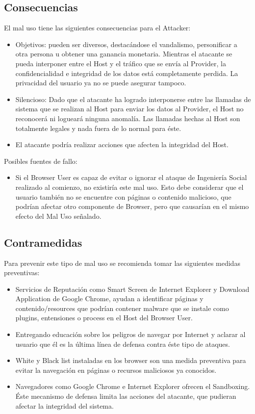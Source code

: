 \subsection{Consecuencias}
	El mal uso tiene las siguientes consecuencias para el Attacker:
	\begin{itemize}
		\item Objetivos: pueden ser diversos, destacándose el vandalismo, personificar a otra persona u obtener una ganancia monetaria. Mientras el atacante se pueda interponer entre el Host y el tráfico que se envía al Provider, la confidencialidad e integridad de los datos está completamente perdida. La privacidad del usuario ya no se puede asegurar tampoco.
		\item Silencioso: Dado que el atacante ha logrado interponerse entre las llamadas de sistema que se realizan al Host para enviar los datos al Provider, el Host no reconocerá ni logueará ninguna anomalía. Las llamadas hechas al Host son totalmente legales y nada fuera de lo normal para éste.
		\item El atacante podría realizar acciones que afecten la integridad del Host.
	\end{itemize}
	Posibles fuentes de fallo:
	\begin{itemize}
		\item Si el Browser User es capaz de evitar o ignorar el ataque de Ingeniería Social realizado al comienzo, no existiría este mal uso. Esto debe considerar que el usuario también no se encuentre con páginas o contenido malicioso, que podrían afectar otro componente de Browser, pero que causarían en el mismo efecto del Mal Uso señalado.
	\end{itemize}

\subsection{Contramedidas} 
	Para prevenir este tipo de mal uso se recomienda tomar las siguientes medidas preventivas:
	\begin{itemize}
		\item Servicios de Reputación como Smart Screen de Internet Explorer y Download Application de Google Chrome, ayudan a identificar páginas y contenido/resources que podrían contener malware que se instale como plugins, entensiones o process en el Host del Browser User.
		\item Entregando educación sobre los peligros de navegar por Internet y aclarar al usuario que él es la última línea de defensa contra éste tipo de ataques.
		\item White y Black list instaladas en los browser son una medida preventiva para evitar la navegación en páginas o recursos maliciosos ya conocidos.
		\item Navegadores como Google Chrome e Internet Explorer ofrecen el Sandboxing. Éste mecanismo de defensa limita las acciones del atacante, que pudieran afectar la integridad del sistema.
	\end{itemize}

